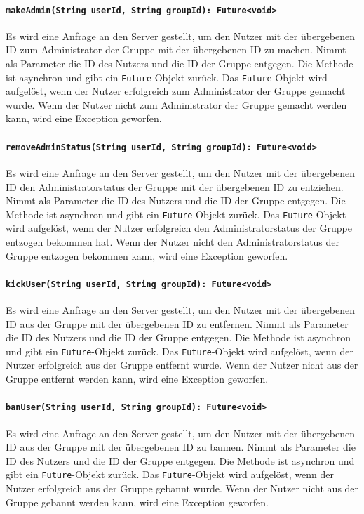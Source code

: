 \documentclass{entwurfsheft}
\begin{document}
\begin{sloppypar}
\paragraph{\texttt{makeAdmin(String userId, String groupId): Future<void>}}
Es wird eine Anfrage an den Server gestellt, um den Nutzer mit der übergebenen ID zum Administrator der Gruppe mit der übergebenen ID zu machen. Nimmt als Parameter die ID des Nutzers und die ID der Gruppe entgegen. Die Methode ist asynchron und gibt ein \texttt{Future}-Objekt zurück. Das \texttt{Future}-Objekt wird aufgelöst, wenn der Nutzer erfolgreich zum Administrator der Gruppe gemacht wurde. Wenn der Nutzer nicht zum Administrator der Gruppe gemacht werden kann, wird eine Exception geworfen.
\paragraph{\texttt{removeAdminStatus(String userId, String groupId): Future<void>}}
Es wird eine Anfrage an den Server gestellt, um den Nutzer mit der übergebenen ID den Administratorstatus der Gruppe mit der übergebenen ID zu entziehen. Nimmt als Parameter die ID des Nutzers und die ID der Gruppe entgegen. Die Methode ist asynchron und gibt ein \texttt{Future}-Objekt zurück. Das \texttt{Future}-Objekt wird aufgelöst, wenn der Nutzer erfolgreich den Administratorstatus der Gruppe entzogen bekommen hat. Wenn der Nutzer nicht den Administratorstatus der Gruppe entzogen bekommen kann, wird eine Exception geworfen.
\paragraph{\texttt{kickUser(String userId, String groupId): Future<void>}}
Es wird eine Anfrage an den Server gestellt, um den Nutzer mit der übergebenen ID aus der Gruppe mit der übergebenen ID zu entfernen. Nimmt als Parameter die ID des Nutzers und die ID der Gruppe entgegen. Die Methode ist asynchron und gibt ein \texttt{Future}-Objekt zurück. Das \texttt{Future}-Objekt wird aufgelöst, wenn der Nutzer erfolgreich aus der Gruppe entfernt wurde. Wenn der Nutzer nicht aus der Gruppe entfernt werden kann, wird eine Exception geworfen.
\paragraph{\texttt{banUser(String userId, String groupId): Future<void>}}
Es wird eine Anfrage an den Server gestellt, um den Nutzer mit der übergebenen ID aus der Gruppe mit der übergebenen ID zu bannen. Nimmt als Parameter die ID des Nutzers und die ID der Gruppe entgegen. Die Methode ist asynchron und gibt ein \texttt{Future}-Objekt zurück. Das \texttt{Future}-Objekt wird aufgelöst, wenn der Nutzer erfolgreich aus der Gruppe gebannt wurde. Wenn der Nutzer nicht aus der Gruppe gebannt werden kann, wird eine Exception geworfen.

\end{sloppypar}
\end{document}
